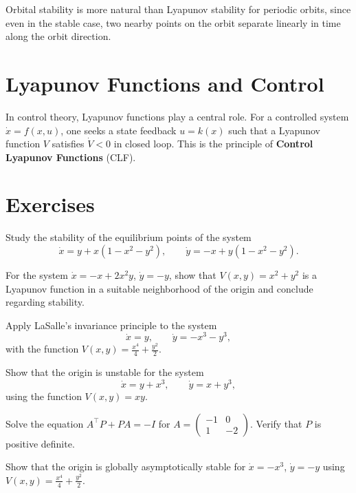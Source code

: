 \begin{remark}
Orbital stability is more natural than Lyapunov stability for periodic orbits,
since even in the stable case, two nearby points on the orbit separate
linearly in time along the orbit direction.
\end{remark}

\section{Lyapunov Functions and Control}

\begin{remark}
In control theory, Lyapunov functions play a central role. For a controlled
system $\dot{x} = f(x, u)$, one seeks a state feedback $u = k(x)$ such that
a Lyapunov function $V$ satisfies $\dot{V} < 0$ in closed loop. This is the
principle of \textbf{Control Lyapunov Functions} (CLF).
\end{remark}

\section{Exercises}

\begin{exercise}
Study the stability of the equilibrium points of the system
\[
    \dot{x} = y + x(1 - x^2 - y^2), \qquad \dot{y} = -x + y(1 - x^2 - y^2).
\]
\end{exercise}

\begin{exercise}
For the system $\dot{x} = -x + 2x^2y$, $\dot{y} = -y$, show that
$V(x,y) = x^2 + y^2$ is a Lyapunov function in a suitable neighborhood
of the origin and conclude regarding stability.
\end{exercise}

\begin{exercise}[LaSalle]
Apply LaSalle's invariance principle to the system
\[
    \dot{x} = y, \qquad \dot{y} = -x^3 - y^3,
\]
with the function $V(x,y) = \frac{x^4}{4} + \frac{y^2}{2}$.
\end{exercise}

\begin{exercise}
Show that the origin is unstable for the system
\[
    \dot{x} = y + x^3, \qquad \dot{y} = x + y^3,
\]
using the function $V(x,y) = xy$.
\end{exercise}

\begin{exercise}
Solve the equation $A^\top P + PA = -I$ for
$A = \begin{pmatrix} -1 & 0 \\ 1 & -2 \end{pmatrix}$.
Verify that $P$ is positive definite.
\end{exercise}

\begin{exercise}
Show that the origin is globally asymptotically stable for
$\dot{x} = -x^3$, $\dot{y} = -y$ using
$V(x,y) = \frac{x^4}{4} + \frac{y^2}{2}$.
\end{exercise}
